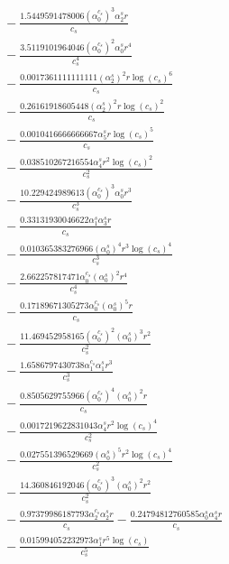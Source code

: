 \documentclass[10pt]{article}
\begin{document}
\begin{align*}
&{}  - \frac{1.5449591478006 \left(\alpha_{0}^{c_s}\right)^{3} \alpha_{2}^s r}{c_{s}} \\
&{}  - \frac{3.5119101964046 \left(\alpha_{0}^{c_s}\right)^{2} \alpha_{0}^s r^{4}}{c_{s}^{4}} \\
&{}  - \frac{0.0017361111111111 \left(\alpha_{2}^s\right)^{2} r \log{\left(c_{s} \right)}^{6}}{c_{s}} \\
&{}  - \frac{0.26161918605448 \left(\alpha_{2}^s\right)^{2} r \log{\left(c_{s} \right)}^{2}}{c_{s}} \\
&{}  - \frac{0.0010416666666667 \alpha_{5}^s r \log{\left(c_{s} \right)}^{5}}{c_{s}} \\
&{}  - \frac{0.038510267216554 \alpha_{4}^s r^{2} \log{\left(c_{s} \right)}^{2}}{c_{s}^{2}} \\
&{}  - \frac{10.229424989613 \left(\alpha_{0}^{c_s}\right)^{3} \alpha_{0}^s r^{3}}{c_{s}^{3}} \\
&{}  - \frac{0.33131930046622 \alpha_{1}^s \alpha_{3}^s r}{c_{s}} \\
&{}  - \frac{0.010365383276966 \left(\alpha_{0}^s\right)^{4} r^{3} \log{\left(c_{s} \right)}^{4}}{c_{s}^{3}} \\
&{}  - \frac{2.662257817471 \alpha_{0}^{c_s} \left(\alpha_{0}^s\right)^{2} r^{4}}{c_{s}^{4}} \\
&{}  - \frac{0.17189671305273 \alpha_{0}^{c_s} \left(\alpha_{0}^s\right)^{5} r}{c_{s}} \\
&{}  - \frac{11.469452958165 \left(\alpha_{0}^{c_s}\right)^{2} \left(\alpha_{0}^s\right)^{3} r^{2}}{c_{s}^{2}} \\
&{}  - \frac{1.6586797430738 \alpha_{1}^{c_s} \alpha_{1}^s r^{3}}{c_{s}^{3}} \\
&{}  - \frac{0.8505629755966 \left(\alpha_{0}^{c_s}\right)^{4} \left(\alpha_{0}^s\right)^{2} r}{c_{s}} \\
&{}  - \frac{0.0017219622831043 \alpha_{4}^s r^{2} \log{\left(c_{s} \right)}^{4}}{c_{s}^{2}} \\
&{}  - \frac{0.027551396529669 \left(\alpha_{0}^s\right)^{5} r^{2} \log{\left(c_{s} \right)}^{4}}{c_{s}^{2}} \\
&{}  - \frac{14.360846192046 \left(\alpha_{0}^{c_s}\right)^{3} \left(\alpha_{0}^s\right)^{2} r^{2}}{c_{s}^{2}} \\
&{}  - \frac{0.97379986187793 \alpha_{2}^{c_s} \alpha_{2}^s r}{c_{s}} - \frac{0.24794812760585 \alpha_{0}^s \alpha_{4}^s r}{c_{s}} \\
&{}  - \frac{0.015994052232973 \alpha_{1}^s r^{5} \log{\left(c_{s} \right)}}{c_{s}^{5}} \\

\end{align*}
\end{document}
